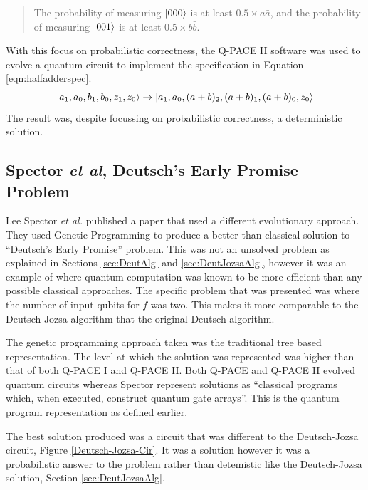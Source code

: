 \begin{quote}
The probability of measuring $\left\vert{000}\right\rangle$ is at least $0.5 \times a\bar{a}$, and the probability of measuring $\left\vert{001}\right\rangle$ is at least $0.5 \times b\bar{b}$.\cite{masseythesis}
\end{quote}

With this focus on probabilistic correctness, the Q-PACE II software was used to evolve a quantum circuit to implement the specification in Equation \ref{eqn:halfadderspec}.
\begin{equation}
 \left\vert{a_1, a_0, b_1, b_0, z_1, z_0}\right\rangle \rightarrow \left\vert{a_1, a_0, (a+b)_2, (a+b)_1, (a+b)_0, z_0}\right\rangle
 \label{eqn:halfadderspec}
\end{equation}
The result was, despite focussing on probabilistic correctness, a deterministic solution\cite{masseythesis}.


\subsection{Spector \emph{et al}, Deutsch's Early Promise Problem}
\label{sec:spectordeutschmajon}
Lee Spector \emph{et al.}\cite{LSpectorGPforQC,LSpectorANDOR,Spector:1999:QCA:316573.317112} published a paper that used a different evolutionary approach.
They used Genetic Programming to produce a better than classical solution to ``Deutsch's Early Promise''\cite{LSpectorGPforQC,LSpectorANDOR,Spector:1999:QCA:316573.317112} problem.
This was not an unsolved problem as explained in Sections \ref{sec:DeutAlg} and \ref{sec:DeutJozsaAlg}, however it was an example of where quantum computation was known to be more efficient than any possible classical approaches.
The specific problem that was presented was where the number of input qubits for $f$ was two.
This makes it more comparable to the Deutsch-Jozsa algorithm that the original Deutsch algorithm.

The genetic programming approach taken was the traditional tree based representation.
The level at which the solution was represented was higher than that of both Q-PACE I and Q-PACE II.
Both Q-PACE and Q-PACE II evolved quantum circuits whereas Spector represent solutions as ``classical programs which, when executed, construct quantum gate arrays''.
This is the quantum program representation as defined earlier.

The best solution produced was a circuit that was different to the Deutsch-Jozsa circuit, Figure \ref{Deutsch-Jozsa-Cir}.
It was a solution however it was a probabilistic answer to the problem rather than detemistic like the Deutsch-Jozsa solution, Section \ref{sec:DeutJozsaAlg}.


